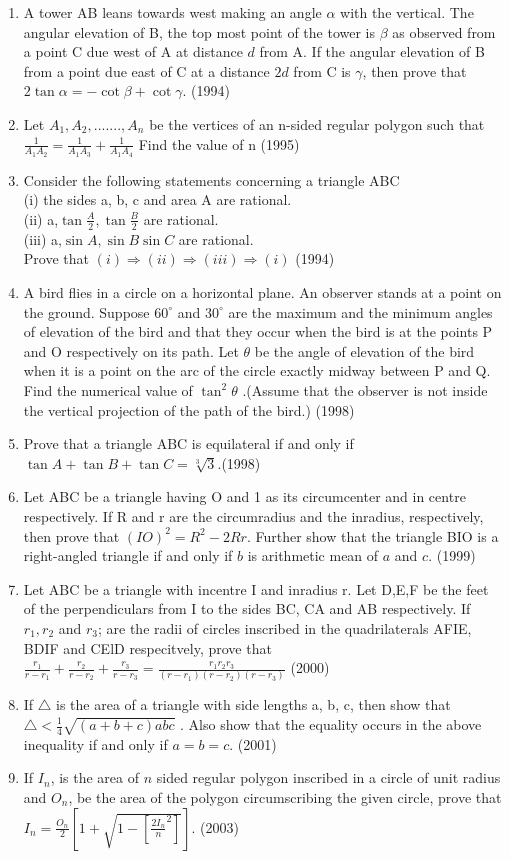 \documentclass[12pt]{article}
\providecommand{\sbrak}[1]{\ensuremath{{}\left[#1\right]}}
\begin{document}
\begin{enumerate}
\item A tower AB leans towards west making an angle $\alpha$ with the vertical. The angular elevation of B, the top most point of the tower is $\beta$ as observed from a point C due west of A at distance $d$ from A. If the angular elevation of B from a point due east of C at a distance $2d$ from C is $\gamma$, then prove that $2\tan \alpha=-\cot \beta + \cot \gamma$. (1994)
\item Let $A_1,A_2,.......,A_n$ be the vertices of an n-sided regular polygon such that 
$\frac{1}{A_1A_2}=\frac{1}{A_1A_3}+\frac{1}{A_1A_4}$ Find the value of n (1995)
\item Consider the following statements concerning a triangle ABC\\
(i) the sides a, b, c and area A are rational.\\
(ii) a,$\tan \frac{A}{2},\tan \frac{B}{2}$ are rational.\\
(iii) a,$\sin A,\sin B\sin C$ are rational.\\
Prove that $(i)\Rightarrow(ii)\Rightarrow(iii)\Rightarrow(i)$  (1994)
\item A bird flies in a circle on a horizontal plane. An observer stands at a point on the ground. Suppose $60^\circ$ and $30^\circ$ are the maximum and the minimum angles of elevation of the bird and that they occur when the bird is at the points P and O respectively on its path. Let $\theta$ be the angle of elevation of the bird when it is a point on the arc of the circle exactly midway between P and Q. Find the numerical value of $\tan^2\theta$ .(Assume that the observer is not inside the vertical projection of the path of the bird.) (1998)
\item Prove that a triangle ABC is equilateral if and only if $\tan A+\tan B+\tan C =\sqrt[3]{3}$.(1998)
\item Let ABC be a triangle having O and 1 as its circumcenter and in centre respectively. If R and r are the circumradius and the inradius, respectively, then prove that $(IO)^2=R^2-2Rr$. Further show that the triangle BIO is a right-angled triangle
if and only if $b$ is arithmetic mean of $a$ and $c$. (1999)
\item Let ABC be a triangle with incentre I and inradius r. Let D,E,F be the feet of the perpendiculars from I to the sides BC, CA and AB respectively. If $r_1,r_2$ and $r_3$; are the radii of circles inscribed in the quadrilaterals AFIE, BDIF and CElD respecitvely, prove that $\frac{r_1}{r-r_1}+\frac{r_2}{r-r_2}+\frac{r_3}{r-r_3}=\frac{r_1r_2r_3}{(r-r_1)(r-r_2)(r-r_3)}$ (2000)
\item If $\triangle$ is the area of a triangle with side lengths a, b, c, then show that $\triangle<\frac{1}{4}\sqrt{(a+b+c)abc}$ . Also show that the equality occurs in the above inequality if and only if $a=b=c$. (2001)
\item If $I_n$, is the area of $n$ sided regular polygon inscribed in a circle of unit radius and $O_n$, be the area of the polygon circumscribing the given circle, prove that $I_n=\frac{O_n}{2}\sbrak{1+\sqrt{1-\sbrak{\frac{2I_n}{n}^2}}}$. (2003)


\end{enumerate}
\end{document}
